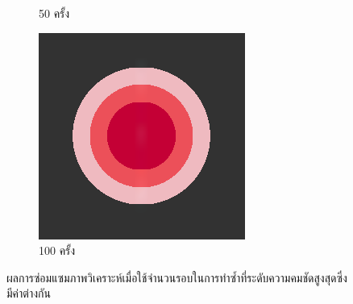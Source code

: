 \begin{figure}[H]
\begin{subfigure}{0.4\linewidth}
        \caption{50 ครั้ง}
    \end{subfigure}
    \begin{subfigure}{0.4\linewidth}
        \centering
        \includegraphics[width=0.53\linewidth]{image/just10enough/only100time.png}			
        \caption{100 ครั้ง}
    \end{subfigure}
    \caption{ผลการซ่อมแซมภาพวิเคราะห์เมื่อใช้จำนวนรอบในการทำซ้ำที่ระดับความคมชัดสูงสุดซึ่งมีค่าต่างกัน}
    \label{figure:just-ten-enough}

\end{figure}